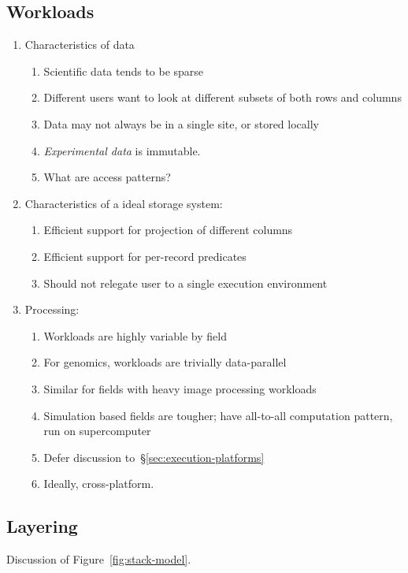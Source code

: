 \documentclass{acm_proc_article-sp}
\begin{document}
\subsection{Workloads}
\label{sec:workloads}

\begin{enumerate}
\item Characteristics of data
\begin{enumerate}
\item Scientific data tends to be sparse
\item Different users want to look at different subsets of both rows and columns
\item Data may not always be in a single site, or stored locally
\item \emph{Experimental data} is immutable.
\item What are access patterns?
\end{enumerate}
\item Characteristics of a ideal storage system:
\begin{enumerate}
\item Efficient support for projection of different columns
\item Efficient support for per-record predicates
\item Should not relegate user to a single execution environment
\end{enumerate}
\item Processing:
\begin{enumerate}
\item Workloads are highly variable by field
\item For genomics, workloads are trivially data-parallel
\item Similar for fields with heavy image processing workloads
\item Simulation based fields are tougher; have all-to-all computation pattern, run on supercomputer
\item Defer discussion to~\S\ref{sec:execution-platforms}
\item Ideally, cross-platform.
\end{enumerate}
\end{enumerate}

\subsection{Layering}
\label{sec:layering}

Discussion of Figure~\ref{fig:stack-model}.
\end{document}
